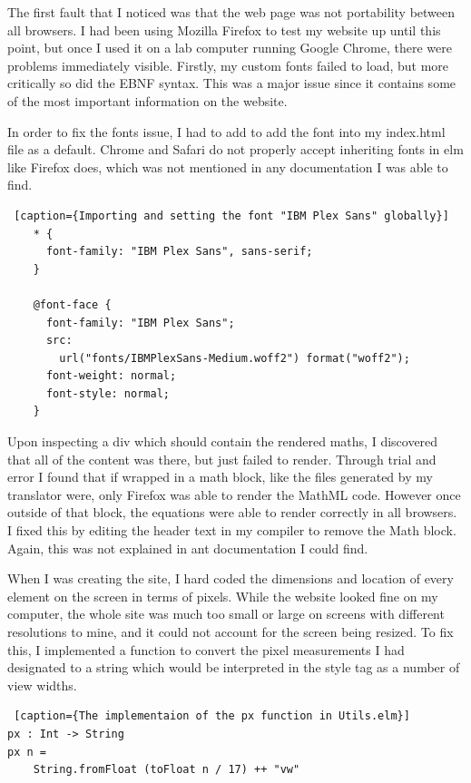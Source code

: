 \documentclass{l4proj}
\begin{document}
The first fault that I noticed was that the web page was not portability between all browsers.  I had been using Mozilla Firefox to test my website up until this point, but once I used it on a lab computer running Google Chrome, there were problems immediately visible.  Firstly, my custom fonts failed to load, but more critically so did the EBNF syntax.  This was a major issue since it contains some of the most important information on the website.

In order to fix the fonts issue, I had to add to add the font into my index.html file as a default.  Chrome and Safari do not properly accept inheriting fonts in elm like Firefox does, which was not mentioned in any documentation I was able to find.

\begin{lstlisting} [caption={Importing and setting the font "IBM Plex Sans" globally}]
    * {
      font-family: "IBM Plex Sans", sans-serif;
    }
    
    @font-face {
      font-family: "IBM Plex Sans";
      src:
        url("fonts/IBMPlexSans-Medium.woff2") format("woff2");
      font-weight: normal;
      font-style: normal;
    }
\end{lstlisting}

Upon inspecting a div which should contain the rendered maths, I discovered that all of the content was there, but just failed to render.  Through trial and error I found that if wrapped in a math block, like the files generated by my translator were, only Firefox was able to render the MathML code.  However once outside of that block, the equations were able to render correctly in all browsers.  I fixed this by editing the header text in my compiler to remove the Math block.  Again, this was not explained in ant documentation I could find.

When I was creating the site, I hard coded the dimensions and location of every element on the screen in terms of pixels.  While the website looked fine on my computer, the whole site was much too small or large on screens with different resolutions to mine, and it could not account for the screen being resized.  To fix this, I implemented a function to convert the pixel measurements I had designated to a string which would be interpreted in the style tag as a number of view widths.

\begin{lstlisting} [caption={The implementaion of the px function in Utils.elm}]
px : Int -> String
px n =
    String.fromFloat (toFloat n / 17) ++ "vw"
\end{lstlisting}
\end{document}
